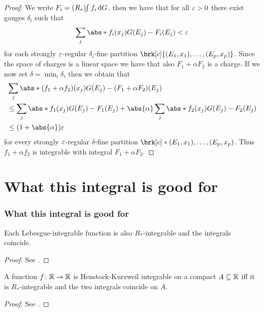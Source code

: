 \begin{frame}
	\begin{proof}
	We write $F_i=(R_*)\!\!\int f_i\,\mathrm{d} G$. then we have that for all $\varepsilon>0$ there exist gauges $\delta_i$ such that
	\begin{align*}
		\sum_j\abs*{f_i(x_j)G(E_j)-F_i(E_j)}<\e
	\end{align*}
	for each strongly $\varepsilon$-regular $\delta_i$-fine partition $\brk[c]{(E_1,x_1),\dots,(E_p,x_p)}$. Since the space of charges is a linear space we have that also $F_1+\alpha F_2$ is a charge.
	If we now set $\delta=\min_i\delta_i$ then we obtain that
	\begin{align*}
		&\sum_j\abs*{(f_1+\alpha f_2)(x_j)G(E_j)-(F_1+\alpha F_2)(E_j)} \\
		&\leq \sum_j\abs*{f_1(x_j)G(E_j)-F_1(E_j)}+\abs{\alpha}\sum_j\abs*{f_2(x_j)G(E_j)-F_2(E_j)} \\
		&\leq (1+\abs{\alpha})\e
	\end{align*}
	for every strongly $\varepsilon$-regular $\delta$-fine partition $\brk[c]*{(E_1,x_1),\dots,(E_p,x_p)}$. Thus $f_1+\alpha f_2$ is integrable with integral $F_1+\alpha F_2$.
	\end{proof}
\end{frame}

\section{What this integral is good for}
\begin{frame}
	\frametitle{What this integral is good for}
	\begin{proposition}
	Each Lebesgue-integrable function is also $R_*$-integrable and the integrals coincide.
	\end{proposition}
	\begin{proof}
	See \cite[Proposition 3.5]{Pfe2016}.
	\end{proof}
\end{frame}

\begin{frame}
	\begin{proposition}
	A function $f\colon\mathbb{R}\to\mathbb{R}$ is Henstock-Kurzweil integrable on a compact $A\subseteq\mathbb{R}$ iff it is $R_*$-integrable and the two integrals coincide on $A$.
	\end{proposition}
	\begin{proof}
	See \cite[Proposition 3.6]{Pfe2016}.
	\end{proof}
\end{frame}

